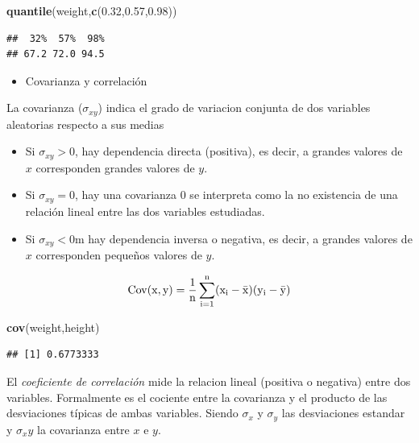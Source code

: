 \documentclass[]{book}
\newenvironment{Shaded}{\begin{snugshade}}{\end{snugshade}}
\newcommand{\KeywordTok}[1]{\textcolor[rgb]{0.13,0.29,0.53}{\textbf{#1}}}
\newcommand{\FloatTok}[1]{\textcolor[rgb]{0.00,0.00,0.81}{#1}}
\newcommand{\NormalTok}[1]{#1}
\providecommand{\tightlist}{%
  \setlength{\itemsep}{0pt}\setlength{\parskip}{0pt}}
\begin{document}
\begin{Shaded}
\begin{Highlighting}[]
\KeywordTok{quantile}\NormalTok{(weight,}\KeywordTok{c}\NormalTok{(}\FloatTok{0.32}\NormalTok{,}\FloatTok{0.57}\NormalTok{,}\FloatTok{0.98}\NormalTok{))}
\end{Highlighting}
\end{Shaded}

\begin{verbatim}
##  32%  57%  98% 
## 67.2 72.0 94.5
\end{verbatim}

\begin{itemize}
\tightlist
\item
  Covarianza y correlación
\end{itemize}

La covarianza (\(\sigma_{xy}\)) indica el grado de variacion conjunta de
dos variables aleatorias respecto a sus medias

\begin{itemize}
\tightlist
\item
  Si \(\sigma_{xy}> 0\), hay dependencia directa (positiva), es decir, a
  grandes valores de \(x\) corresponden grandes valores de \(y\).
\item
  Si \(\sigma_{xy}= 0\), hay una covarianza 0 se interpreta como la no
  existencia de una relación lineal entre las dos variables estudiadas.
\item
  Si \(\sigma_{xy}< 0\)m hay dependencia inversa o negativa, es decir, a
  grandes valores de \(x\) corresponden pequeños valores de \(y\).
\end{itemize}

\[
\rm{Cov}(x,y) = \frac{1}{n}\sum_{i=1}^{n}(x_i - \bar{x})(y_i - \bar{y})
\]

\begin{Shaded}
\begin{Highlighting}[]
\KeywordTok{cov}\NormalTok{(weight,height)}
\end{Highlighting}
\end{Shaded}

\begin{verbatim}
## [1] 0.6773333
\end{verbatim}

El \emph{coeficiente de correlación} mide la relacion lineal (positiva o
negativa) entre dos variables. Formalmente es el cociente entre la
covarianza y el producto de las desviaciones típicas de ambas variables.
Siendo \(\sigma_x\) y \(\sigma_y\) las desviaciones estandar y
\(\sigma_xy\) la covarianza entre \(x\) e \(y\).
\end{document}
